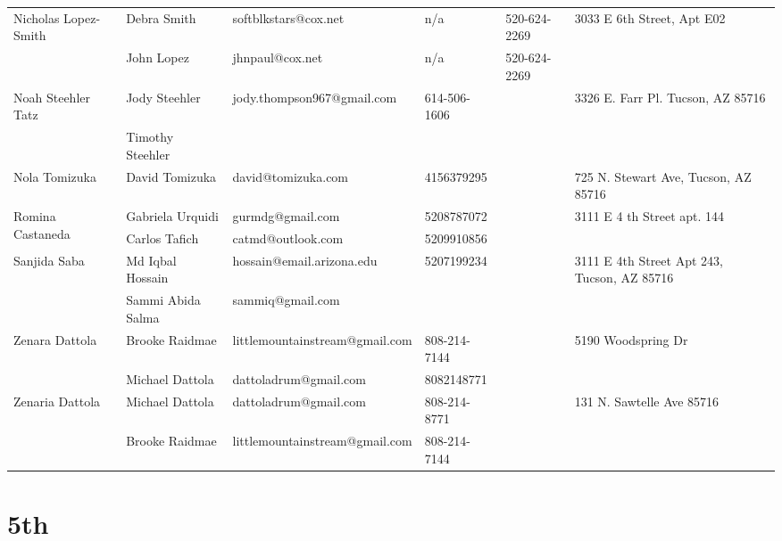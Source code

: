 \documentclass[landscape]{article}\usepackage[]{graphicx}\usepackage[]{color}
\begin{document}
\begin{longtable}{|p{100pt}|p{100pt}|p{140pt}|p{60pt}|p{64pt}|p{120pt}|}
 &  &  &  &  & \\
\hline
\multirow{2}{100pt}{Nicholas Lopez-Smith} & Debra Smith & softblkstars@cox.net & n/a & 520-624-2269 & \multirow{2}{120pt}{3033 E 6th Street, Apt E02} \\
 & John Lopez & jhnpaul@cox.net & n/a & 520-624-2269 & \\
\hline
\multirow{2}{100pt}{Noah Steehler Tatz} & Jody Steehler & jody.thompson967@gmail.com & 614-506-1606 &  & \multirow{2}{120pt}{3326 E. Farr Pl. Tucson, AZ 85716} \\
 & Timothy Steehler &  &  &  & \\
\hline
\multirow{2}{100pt}{Nola Tomizuka} & David Tomizuka & david@tomizuka.com & 4156379295 &  & \multirow{2}{120pt}{725 N. Stewart Ave, Tucson, AZ 85716} \\
 &  &  &  &  & \\
\hline
\multirow{2}{100pt}{Romina Castaneda} & Gabriela Urquidi & gurmdg@gmail.com & 5208787072 &  & \multirow{2}{120pt}{3111 E 4 th Street apt. 144} \\
 & Carlos Tafich & catmd@outlook.com & 5209910856 &  & \\
\hline
\multirow{2}{100pt}{Sanjida Saba} & Md Iqbal Hossain & hossain@email.arizona.edu & 5207199234 &  & \multirow{2}{120pt}{3111 E 4th Street Apt 243, Tucson, AZ 85716} \\
 & Sammi Abida Salma & sammiq@gmail.com &  &  & \\
\hline
\multirow{2}{100pt}{Zenara Dattola} & Brooke Raidmae & littlemountainstream@gmail.com & 808-214-7144 &  & \multirow{2}{120pt}{5190 Woodspring Dr} \\
 & Michael Dattola & dattoladrum@gmail.com & 8082148771 &  & \\
\hline
\multirow{2}{100pt}{Zenaria Dattola} & Michael Dattola & dattoladrum@gmail.com & 808-214-8771 &  & \multirow{2}{120pt}{131 N. Sawtelle Ave 85716} \\
 & Brooke Raidmae & littlemountainstream@gmail.com & 808-214-7144 &  & \\
\hline
\end{longtable}
\newpage
\section{5th}
\end{document}
